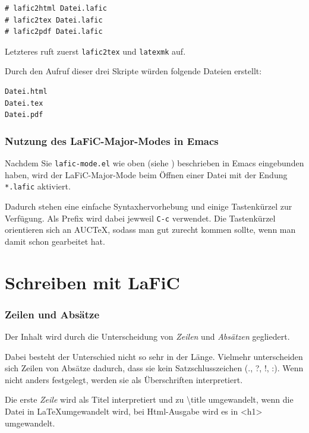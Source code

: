 \documentclass{scrartcl}
\begin{document}
\begin{verbatim}
# lafic2html Datei.lafic
# lafic2tex Datei.lafic
# lafic2pdf Datei.lafic

\end{verbatim}

Letzteres ruft zuerst \texttt{lafic2tex} und \texttt{latexmk} auf.

Durch den Aufruf dieser drei Skripte würden folgende Dateien
erstellt:

\begin{verbatim}
Datei.html
Datei.tex
Datei.pdf

\end{verbatim}

\section{Nutzung des LaFiC-Major-Modes in Emacs}

Nachdem Sie \texttt{lafic-mode.el} wie oben (siehe \xspace )
beschrieben in Emacs eingebunden haben, wird der
LaFiC-Major-Mode beim Öffnen einer Datei mit der Endung
\texttt{*.lafic} aktiviert.

Dadurch stehen eine einfache Syntaxhervorhebung und einige
Tastenkürzel zur Verfügung. Als Prefix wird dabei jewweil
\texttt{C-c} verwendet. Die Tastenkürzel orientieren sich an AUCTeX,
sodass man gut zurecht kommen sollte, wenn man damit schon
gearbeitet hat.

\part{Schreiben mit LaFiC}

\section{Zeilen und Absätze}

Der Inhalt wird durch die Unterscheidung von \emph{Zeilen} und
\emph{Absätzen} gegliedert.

Dabei besteht der Unterschied nicht so sehr in der
Länge. Vielmehr unterscheiden sich Zeilen von Absätze
dadurch, dass sie kein Satzschlusszeichen (., ?, !, :).
Wenn nicht anders festgelegt, werden sie als Überschriften
interpretiert.

Die erste \emph{Zeile} wird als Titel interpretiert und zu \textbackslash title
umgewandelt, wenn die Datei in \LaTeX umgewandelt wird, bei
Html-Ausgabe wird es in <h1> umgewandelt.
\end{document}
